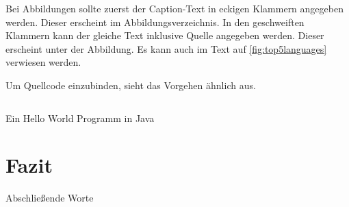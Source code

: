 \documentclass[a4paper,12pt]{scrreprt}
\begin{document}
Bei Abbildungen sollte zuerst der Caption-Text in eckigen Klammern angegeben werden.
Dieser erscheint im Abbildungsverzeichnis.
In den geschweiften Klammern kann der gleiche Text inklusive Quelle angegeben werden.
Dieser erscheint unter der Abbildung.
Es kann auch im Text auf \autoref{fig:top5languages} verwiesen werden.

Um Quellcode einzubinden, sieht das Vorgehen ähnlich aus.

\begin{listing}[h]
    \inputminted{Java}{code/HelloWorld.java}
    \unskip
    \caption{Ein Hello World Programm in Java}
    \label{lst:helloworld}
\end{listing}


\chapter{Fazit}
Abschließende Worte

\printbibliography

\end{document}
